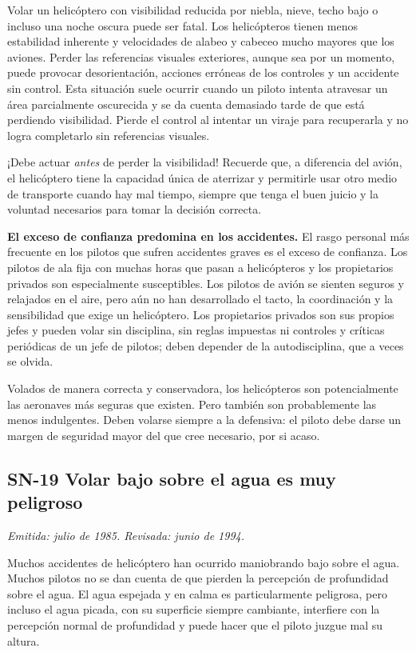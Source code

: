 Volar un helicóptero con visibilidad reducida por niebla, nieve, techo bajo o incluso una noche oscura puede ser fatal. Los helicópteros tienen menos estabilidad inherente y velocidades de alabeo y cabeceo mucho mayores que los aviones. Perder las referencias visuales exteriores, aunque sea por un momento, puede provocar desorientación, acciones erróneas de los controles y un accidente sin control. Esta situación suele ocurrir cuando un piloto intenta atravesar un área parcialmente oscurecida y se da cuenta demasiado tarde de que está perdiendo visibilidad. Pierde el control al intentar un viraje para recuperarla y no logra completarlo sin referencias visuales.

¡Debe actuar \emph{antes} de perder la visibilidad! Recuerde que, a diferencia del avión, el helicóptero tiene la capacidad única de aterrizar y permitirle usar otro medio de transporte cuando hay mal tiempo, siempre que tenga el buen juicio y la voluntad necesarios para tomar la decisión correcta.

\textbf{El exceso de confianza predomina en los accidentes.} El rasgo personal más frecuente en los pilotos que sufren accidentes graves es el exceso de confianza. Los pilotos de ala fija con muchas horas que pasan a helicópteros y los propietarios privados son especialmente susceptibles. Los pilotos de avión se sienten seguros y relajados en el aire, pero aún no han desarrollado el tacto, la coordinación y la sensibilidad que exige un helicóptero. Los propietarios privados son sus propios jefes y pueden volar sin disciplina, sin reglas impuestas ni controles y críticas periódicas de un jefe de pilotos; deben depender de la autodisciplina, que a veces se olvida.

Volados de manera correcta y conservadora, los helicópteros son potencialmente las aeronaves más seguras que existen. Pero también son probablemente las menos indulgentes. Deben volarse siempre a la defensiva: el piloto debe darse un margen de seguridad mayor del que cree necesario, por si acaso.

\subsection*{SN-19 \quad Volar bajo sobre el agua es muy peligroso}
{\small\textit{Emitida: julio de 1985. Revisada: junio de 1994.}}

Muchos accidentes de helicóptero han ocurrido maniobrando bajo sobre el agua. Muchos pilotos no se dan cuenta de que pierden la percepción de profundidad sobre el agua. El agua espejada y en calma es particularmente peligrosa, pero incluso el agua picada, con su superficie siempre cambiante, interfiere con la percepción normal de profundidad y puede hacer que el piloto juzgue mal su altura.

